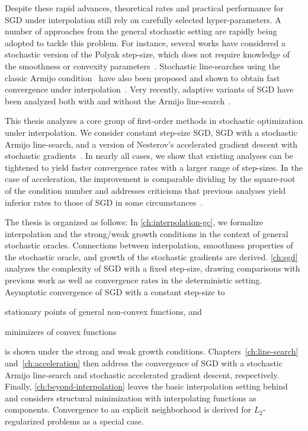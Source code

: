 Despite these rapid advances, theoretical rates and practical performance for \ac{SGD} under interpolation still rely on carefully selected hyper-parameters.
A number of approaches from the general stochastic setting are rapidly being adopted to tackle this problem.
For instance, several works have considered a stochastic version of the Polyak step-size, which does not require knowledge of the smoothness or convexity parameters~\citep{loizou2020sps, berrada2019training}. 
Stochastic line-searches using the classic Armijo condition~\citep{armijo1966ls} have also been proposed and shown to obtain fast convergence under interpolation~\citep{vaswani2019painless}.
Very recently, adaptive variants of \ac{SGD} have been analyzed both with and without the Armijo line-search~\citep{vaswani2020adaptive}.

This thesis analyzes a core group of first-order methods in stochastic optimization under interpolation.
We consider constant step-size \ac{SGD}, \ac{SGD} with a stochastic Armijo line-search, and a version of Nesterov's accelerated gradient descent with stochastic gradients~\citep{nesterov2004lectures}. 
In nearly all cases, we show that existing analyses can be tightened to yield faster convergence rates with a larger range of step-sizes. 
In the case of acceleration, the improvement is comparable dividing by the square-root of the condition number and addresses criticisms that previous analyses yield inferior rates to those of \ac{SGD} in some circumstances~\citep{liu2020accelerating}. 

The thesis is organized as follows: 
In \autoref{ch:interpolation-gc}, we formalize interpolation and the strong/weak growth conditions in the context of general stochastic oracles. 
Connections between interpolation, smoothness properties of the stochastic oracle, and growth of the stochastic gradients are derived.
\autoref{ch:sgd} analyzes the complexity of \ac{SGD} with a fixed step-size, drawing comparisons with previous work as well as convergence rates in the deterministic setting. 
Asymptotic convergence of SGD with a constant step-size to
\begin{inparaenum}[(i)]
\item stationary points of general non-convex functions, and
\item minimizers of convex functions 
\end{inparaenum}
is shown under the strong and weak growth conditions.
Chapters~\ref{ch:line-search} and~\ref{ch:acceleration} then address the convergence of \ac{SGD} with a stochastic Armijo line-search and stochastic accelerated gradient descent, respectively. 
Finally, \autoref{ch:beyond-interpolation} leaves the basic interpolation setting behind and considers structural minimization with interpolating functions as components. 
Convergence to an explicit neighborhood is derived for \( L_2 \)-regularized problems as a special case. 


